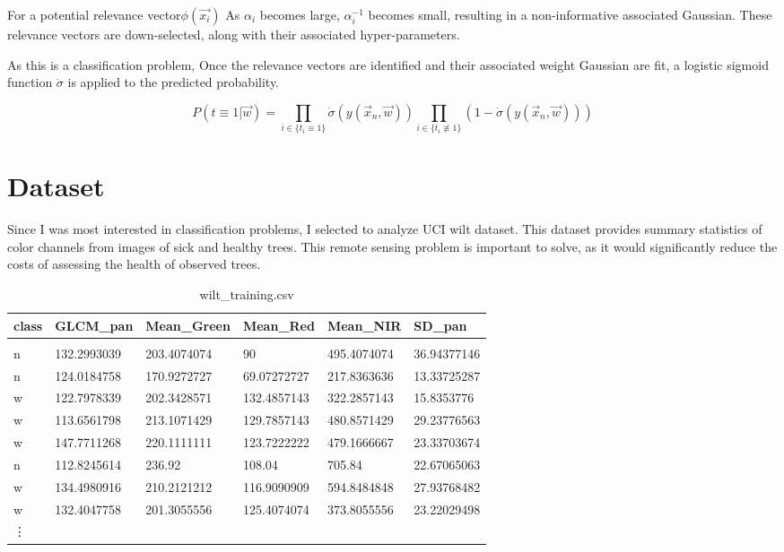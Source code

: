 \documentclass[11pt]{article} %
\def\rv{relevance vector\xspace}
\def\wilt{UCI wilt dataset\xspace}
\begin{document}
For a potential \rv $\phi(\vec{x_i})$ As $\alpha_i$ becomes large,
$\alpha_i^{-1}$ becomes small, resulting in a non-informative
associated Gaussian. These \rv{}s are down-selected, along
with their associated hyper-parameters.

As this is a classification problem, Once the \rv{}s are identified
and their associated weight Gaussian are fit, a logistic sigmoid
function $\dot{\sigma}$ is applied to the predicted probability.

\[P(t\equiv 1|\vec{w}) = \prod_{i\in \{t_i \equiv 1\}}\dot{\sigma}(y(\vec{x}_n, \vec{w})) \prod_{i\in \{t_i \not\equiv 1\}}\left(1-\dot{\sigma}(y(\vec{x}_n, \vec{w}))\right)\]

\section{Dataset}
Since I was most interested in classification problems, I
selected to analyze \wilt. This dataset provides summary
statistics of color channels from images of sick and healthy
trees. This remote sensing problem is important to solve, as
it would significantly reduce the costs of assessing the
health of observed trees.

\begin{table}[!h]
\centering
\caption{wilt\_training.csv}
\label{wilt_training.csv}
\begin{tabular}{llllll}
  {\bf class} & {\bf GLCM\_pan}   & {\bf Mean\_Green} & {\bf Mean\_Red}   & {\bf Mean\_NIR}   & {\bf SD\_pan} \\\hline\\
n     & 132.2993039 & 203.4074074 & 90          & 495.4074074 & 36.94377146 \\
n     & 124.0184758 & 170.9272727 & 69.07272727 & 217.8363636 & 13.33725287 \\
w     & 122.7978339 & 202.3428571 & 132.4857143 & 322.2857143 & 15.8353776  \\
w     & 113.6561798 & 213.1071429 & 129.7857143 & 480.8571429 & 29.23776563 \\
w     & 147.7711268 & 220.1111111 & 123.7222222 & 479.1666667 & 23.33703674 \\
n     & 112.8245614 & 236.92      & 108.04      & 705.84      & 22.67065063 \\
w     & 134.4980916 & 210.2121212 & 116.9090909 & 594.8484848 & 27.93768482 \\
w     & 132.4047758 & 201.3055556 & 125.4074074 & 373.8055556 & 23.22029498 \\
\vdots
\end{tabular}
\end{table}
\end{document}
